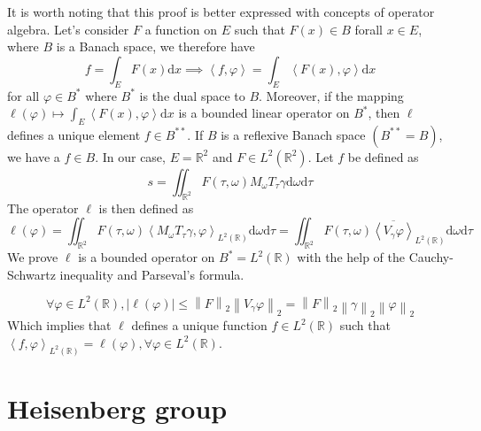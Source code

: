 \documentclass[american,]{article}
\theoremstyle{definition}
\theoremstyle{definition}
\theoremstyle{definition}
\theoremstyle{remark}
\begin{document}
It is worth noting that this proof is better expressed with concepts of operator algebra.
Let's consider \(F\) a function on \(E\) such that \(F(x)\in B\) forall \(x\in E\),
where \(B\) is a Banach space, we therefore have
\begin{equation}
f = \int_E F(x)\mathrm{d}x\implies \left\langle f,\varphi\right\rangle = \int_E \left\langle F(x),\varphi\right\rangle \mathrm{d}x
\end{equation}
for all \(\varphi\in B^*\) where \(B^*\) is the dual space to \(B\).
Moreover, if the mapping \(\ell(\varphi)\mapsto\int_E \left\langle F(x),\varphi\right\rangle\mathrm{d}x\)
is a bounded linear operator on \(B^*\), then \(\ell\) defines a unique element \(f\in B^{**}\).
If \(B\) is a reflexive Banach space \(\left(B^{**}=B\right)\), we have a \(f\in B\).
In our case, \(E=\mathbb{R}^2\) and \(F\in L^2(\mathbb{R}^2)\). Let \(f\) be defined as
\begin{equation}
s = \iint_{\mathbb{R}^2} F(\tau,\omega)M_\omega T_\tau \gamma \mathrm{d}\omega\mathrm{d}\tau
\end{equation}
The operator \(\ell\) is then defined as
\begin{equation}
\ell(\varphi) = \iint_{\mathbb{R}^2} F(\tau,\omega)\left\langle M_\omega T_\tau \gamma,\varphi\right\rangle_{L^2(\mathbb{R})} \mathrm{d}\omega\mathrm{d}\tau
          = \iint_{\mathbb{R}^2} F(\tau,\omega) \overline{\left\langle V_\gamma \varphi\right\rangle}_{L^2(\mathbb{R})} \mathrm{d}\omega\mathrm{d}\tau
\end{equation}
We prove \(\ell\) is a bounded operator on \(B^*=L^2(\mathbb{R})\) with the help
of the Cauchy-Schwartz inequality and Parseval's formula.

\begin{equation}
\forall\varphi\in L^2(\mathbb{R}),\left\lvert\ell(\varphi)\right\rvert \leq \left\lVert F\right\rVert_2 \left\lVert V_\gamma \varphi\right\rVert_2
= \left\lVert F\right\rVert_2 \left\lVert\gamma\right\rVert_2 \left\lVert\varphi\right\rVert_2
\end{equation}
Which implies that \(\ell\) defines a unique function \(f\in L^2(\mathbb{R})\) such that
\(\left\langle f,\varphi\right\rangle_{L^2(\mathbb{R})} = \ell(\varphi),\forall\varphi\in L^2(\mathbb{R})\).

\hypertarget{heisenberg}{%
\section{Heisenberg group}\label{heisenberg}}
\end{document}
